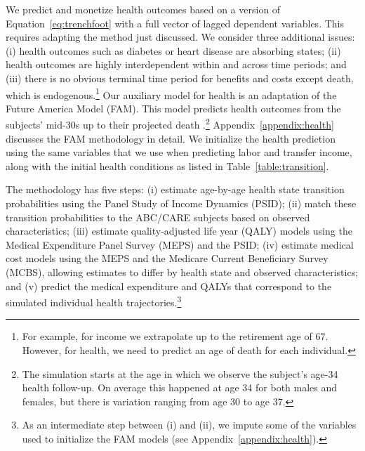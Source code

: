  We predict and monetize health outcomes based on a version of Equation~\eqref{eq:trenchfoot} with a full vector of lagged dependent variables. This requires adapting the method just discussed. We consider three additional issues: (i) health outcomes such as diabetes or heart disease are absorbing states; (ii) health outcomes are highly interdependent within and across time periods; and (iii) there is no obvious terminal time period for benefits and costs except death, which is endogenous.\footnote{For example, for income we extrapolate up to the retirement age of 67. However, for health, we need to predict an age of death for each individual.} Our auxiliary model for health is an adaptation of the Future America Model (FAM). This model predicts health outcomes from the subjects' mid-30s up to their projected death \citep{Goldman_etal_2015_Future-Elderly-Model-Report}.\footnote{The simulation starts at the age in which we observe the subject's age-34 health follow-up. On average this happened at age 34 for both males and females, but there is variation ranging from age 30 to age 37.} Appendix~\ref{appendix:health} discusses the FAM methodology in detail. We initialize the health prediction using the same variables that we use when predicting labor and transfer income, along with the initial health conditions as listed in Table~\ref{table:transition}.

The methodology has five steps: (i) estimate age-by-age health state transition probabilities using the Panel Study of Income Dynamics (PSID); (ii) match these transition probabilities to the ABC/CARE subjects based on observed characteristics; (iii) estimate quality-adjusted life year (QALY) models using the Medical Expenditure Panel Survey (MEPS) and the PSID; (iv) estimate medical cost models using the MEPS and the Medicare Current Beneficiary Survey (MCBS), allowing estimates to differ by health state and observed characteristics; and (v) predict the medical expenditure and QALYs that correspond to the simulated individual health trajectories.\footnote{As an intermediate step between (i) and (ii), we impute some of the variables used to initialize the FAM models (see Appendix~\ref{appendix:health}).}

